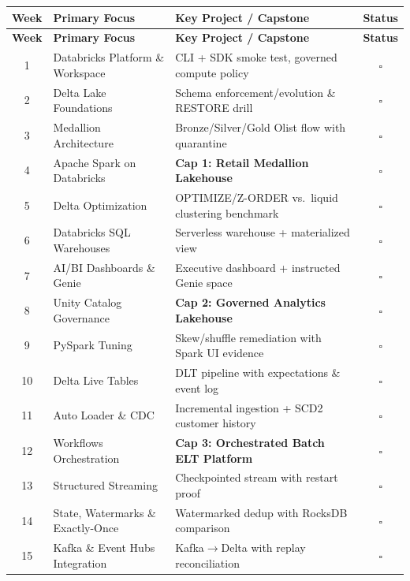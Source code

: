 \documentclass[11pt, a4paper]{article}
\begin{document}
\begin{center}
\renewcommand{\arraystretch}{1.5}
\begin{longtable}{@{} c l p{7cm} c @{}}
\toprule
\textbf{Week} & \textbf{Primary Focus} & \textbf{Key Project / Capstone} & \textbf{Status} \\
\midrule
\endfirsthead

\toprule
\textbf{Week} & \textbf{Primary Focus} & \textbf{Key Project / Capstone} & \textbf{Status} \\
\midrule
\endhead

\bottomrule
\endfoot

\bottomrule
\endlastfoot

1 & Databricks Platform \& Workspace & CLI + SDK smoke test, governed compute policy & $\square$ \\
2 & Delta Lake Foundations & Schema enforcement/evolution \& RESTORE drill & $\square$ \\
3 & Medallion Architecture & Bronze/Silver/Gold Olist flow with quarantine & $\square$ \\
4 & Apache Spark on Databricks & \textbf{Cap 1: Retail Medallion Lakehouse} & $\square$ \\
\midrule
5 & Delta Optimization & OPTIMIZE/Z-ORDER vs.\ liquid clustering benchmark & $\square$ \\
6 & Databricks SQL Warehouses & Serverless warehouse + materialized view & $\square$ \\
7 & AI/BI Dashboards \& Genie & Executive dashboard + instructed Genie space & $\square$ \\
8 & Unity Catalog Governance & \textbf{Cap 2: Governed Analytics Lakehouse} & $\square$ \\
\midrule
9 & PySpark Tuning & Skew/shuffle remediation with Spark UI evidence & $\square$ \\
10 & Delta Live Tables & DLT pipeline with expectations \& event log & $\square$ \\
11 & Auto Loader \& CDC & Incremental ingestion + SCD2 customer history & $\square$ \\
12 & Workflows Orchestration & \textbf{Cap 3: Orchestrated Batch ELT Platform} & $\square$ \\
\midrule
13 & Structured Streaming & Checkpointed stream with restart proof & $\square$ \\
14 & State, Watermarks \& Exactly-Once & Watermarked dedup with RocksDB comparison & $\square$ \\
15 & Kafka \& Event Hubs Integration & Kafka$\rightarrow$Delta with replay reconciliation & $\square$ \\

\end{longtable}
\end{center}
\end{document}

